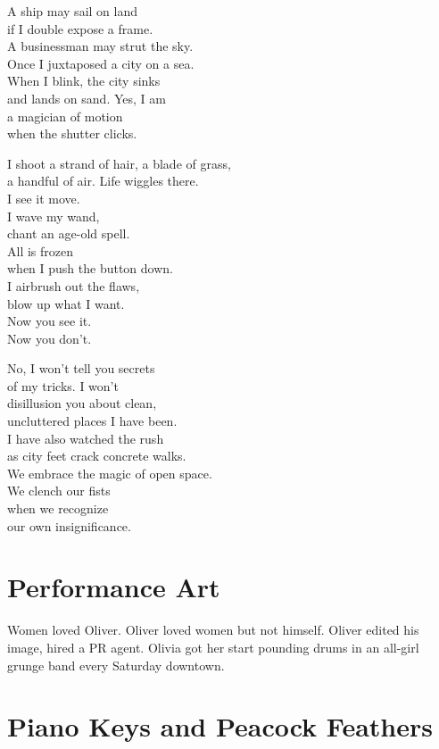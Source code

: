 \documentclass[twoside,10pt]{book}
\begin{document}
A ship may sail on land\\
if I double expose a frame.\\
A businessman may strut the sky.\\
Once I juxtaposed a city on a sea.\\
When I blink, the city sinks\\
and lands on sand. Yes, I am\\
a magician of motion\\
when the shutter clicks.

I shoot a strand of hair, a blade of grass,\\
a handful of air. Life wiggles there.\\
I see it move.\\
I wave my wand,\\
chant an age-old spell.\\
All is frozen\\
when I push the button down.\\
I airbrush out the flaws,\\
blow up what I want.\\
Now you see it.\\
Now you don't.

No, I won't tell you secrets\\
of my tricks. I won't\\
disillusion you about clean,\\
uncluttered places I have been.\\
I have also watched the rush\\
as city feet crack concrete walks.\\
\clearpage
We embrace the magic of open space.\\
We clench our fists\\
when we recognize\\
our own insignificance.


\clearpage
\section{Performance Art}

Women loved Oliver. Oliver loved women but not himself. Oliver edited
his image, hired a PR agent. Olivia got her start pounding drums in an
all-girl grunge band every Saturday downtown.


\clearpage
\section{Piano Keys and Peacock Feathers}
\end{document}
